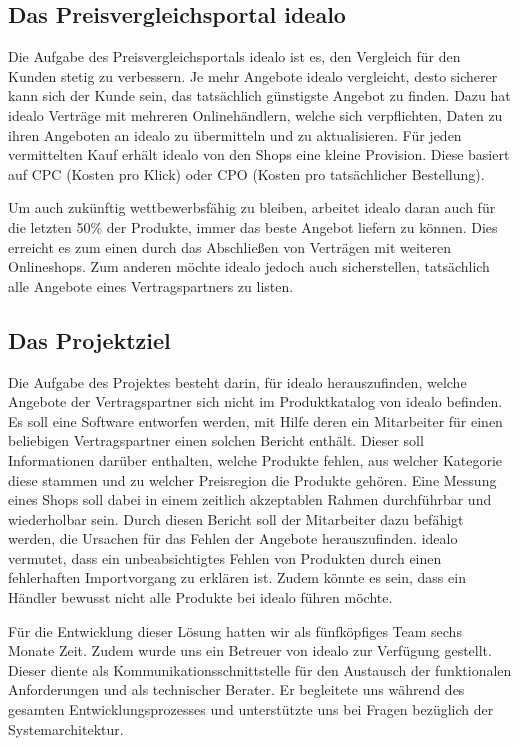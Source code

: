 \subsection{Das Preisvergleichsportal idealo}
\label{subsec:idealo}

Die Aufgabe des Preisvergleichsportals idealo ist es, den Vergleich für den Kunden stetig zu verbessern.
Je mehr Angebote idealo vergleicht, desto sicherer kann sich der Kunde sein, das tatsächlich günstigste Angebot zu
finden.
Dazu hat idealo Verträge mit mehreren Onlinehändlern, welche sich verpflichten, Daten zu ihren Angeboten an idealo zu
übermitteln und zu aktualisieren.
Für jeden vermittelten Kauf erhält idealo von den Shops eine kleine Provision.
Diese basiert auf CPC (Kosten pro Klick) oder CPO (Kosten pro tatsächlicher Bestellung).

Um auch zukünftig wettbewerbsfähig zu bleiben, arbeitet idealo daran auch für die letzten 50\% der Produkte,
immer das beste Angebot liefern zu können.
Dies erreicht es zum einen durch das Abschließen von Verträgen mit weiteren Onlineshops.
Zum anderen möchte idealo jedoch auch sicherstellen, tatsächlich alle Angebote eines Vertragspartners zu listen.

\subsection{Das Projektziel}
\label{subsec:projektziel}

Die Aufgabe des Projektes besteht darin, für idealo herauszufinden, welche Angebote der Vertragspartner sich nicht im
Produktkatalog von idealo befinden.
Es soll eine Software entworfen werden, mit Hilfe deren ein Mitarbeiter für einen beliebigen Vertragspartner einen
solchen Bericht enthält.
Dieser soll Informationen darüber enthalten, welche Produkte fehlen, aus welcher Kategorie diese stammen und zu
welcher Preisregion die Produkte gehören.
Eine Messung eines Shops soll dabei in einem zeitlich akzeptablen Rahmen durchführbar und wiederholbar sein.
Durch diesen Bericht soll der Mitarbeiter dazu befähigt werden, die Ursachen für das Fehlen der Angebote herauszufinden.
idealo vermutet, dass ein unbeabsichtigtes Fehlen von Produkten durch einen fehlerhaften Importvorgang zu erklären ist.
Zudem könnte es sein, dass ein Händler bewusst nicht alle Produkte bei idealo führen möchte.

Für die Entwicklung dieser Lösung hatten wir als fünfköpfiges Team sechs Monate Zeit.
Zudem wurde uns ein Betreuer von idealo zur Verfügung gestellt.
Dieser diente als Kommunikationsschnittstelle für den Austausch der funktionalen Anforderungen und als technischer
Berater.
Er begleitete uns während des gesamten Entwicklungsprozesses und unterstützte uns bei Fragen bezüglich der
Systemarchitektur.

